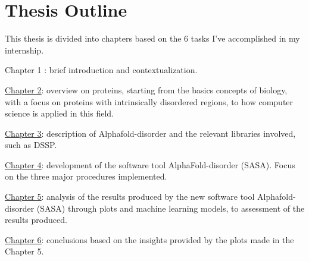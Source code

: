 \section{Thesis Outline}
This thesis is divided into chapters based on the 6 tasks I've accomplished in my internship.

Chapter 1 : brief introduction and contextualization.

\underline{\hyperref[chp:proteins]{Chapter 2}}: overview on proteins, starting from the basics concepts of biology, with a focus on proteins with intrinsically disordered regions, to how computer science is applied in this field.

\underline{\hyperref[chp:alphafold-disorder]{Chapter 3}}: description of Alphafold-disorder and the relevant libraries involved, such as DSSP.

\underline{\hyperref[chp:development]{Chapter 4}}: development of the software tool AlphaFold-disorder (SASA). Focus on the three major procedures implemented.




\underline{\hyperref[chp:analysis]{Chapter 5}}: analysis of the results produced by the new software tool Alphafold-disorder (SASA) through plots and machine learning models, to assessment of the results produced.

\underline{\hyperref[chp:conclusions]{Chapter 6}}: conclusions based on the insights provided by the plots made in the Chapter 5.

